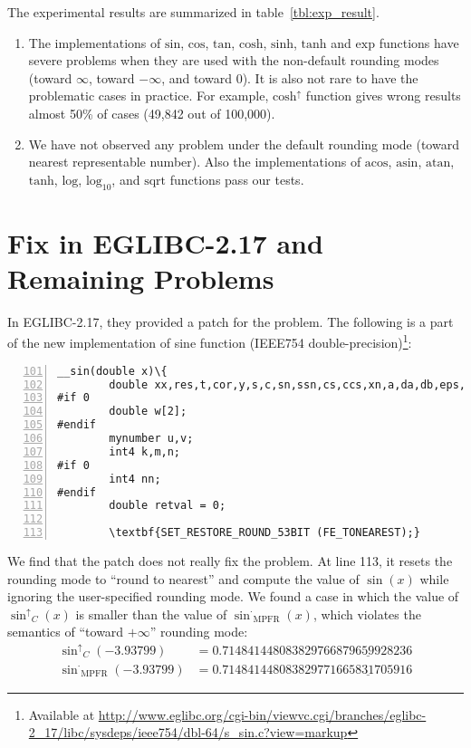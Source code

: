 \documentclass{llncs}
\newcommand{\rup}[1]{\ensuremath{\mathrm{#1}^{\uparrow}}}
\newcommand{\rne}[1]{\ensuremath{\mathrm{#1}^{\cdot}}}
\begin{document}
The experimental results are summarized in table~\ref{tbl:exp_result}.
\begin{enumerate}
\item The implementations of $\mathrm{sin}$, $\mathrm{cos}$,
  $\mathrm{tan}$, $\mathrm{cosh}$, $\mathrm{sinh}$, $\mathrm{tanh}$
  and $\mathrm{exp}$ functions have severe problems when they are used
  with the non-default rounding modes (toward $\infty$, toward
  $-\infty$, and toward $0$). It is also not rare to have the
  problematic cases in practice. For example, $\rup{cosh}$ function
  gives wrong results almost 50\% of cases (49,842 out of 100,000).
\item We have not observed any problem under the default rounding mode
  (toward nearest representable number). Also the implementations of
  $\mathrm{acos}$, $\mathrm{asin}$, $\mathrm{atan}$, $\mathrm{tanh}$,
  $\mathrm{log}$, $\mathrm{log_{10}}$, and $\mathrm{sqrt}$ functions pass
  our tests.
\end{enumerate}

\section{Fix in EGLIBC-2.17 and Remaining Problems}\label{sec:fix}

In EGLIBC-2.17, they provided a patch for the problem. The following
is a part of the new implementation of sine function (IEEE754
double-precision)\footnote{Available at
  \url{http://www.eglibc.org/cgi-bin/viewvc.cgi/branches/eglibc-2_17/libc/sysdeps/ieee754/dbl-64/s_sin.c?view=markup}}:

\begin{Verbatim}[numbers=left, frame=single, firstnumber=101,
  commandchars=\\\{\}, fontsize=\relsize{-1},
  label={\texttt{eglibc-2.17/libc/sysdeps/ieee754/dbl-64/s\_sin.c}},
  labelposition=topline ]
__sin(double x)\{
        double xx,res,t,cor,y,s,c,sn,ssn,cs,ccs,xn,a,da,db,eps,xn1,xn2;
#if 0
        double w[2];
#endif
        mynumber u,v;
        int4 k,m,n;
#if 0
        int4 nn;
#endif
        double retval = 0;

        \textbf{SET_RESTORE_ROUND_53BIT (FE_TONEAREST);}
\end{Verbatim}

We find that the patch does not really fix the problem. At line 113,
it resets the rounding mode to ``round to nearest'' and compute the
value of $\sin(x)$ while ignoring the user-specified rounding mode. We
found a case in which the value of $\rup{\sin}_{C}(x)$ is smaller than
the value of $\rne{\sin}_{\mathrm{MPFR}}(x)$, which violates the
semantics of ``toward $+\infty$'' rounding mode:
\begin{align*}
            \rup{\sin}_{C}(-3.93799) & = 0.7148414480838297\underline{66879659928236}\\
   \rne{\sin}_{\mathrm{MPFR}}(-3.93799) & = 0.7148414480838297\underline{71665831705916}
\end{align*}
\end{document}
